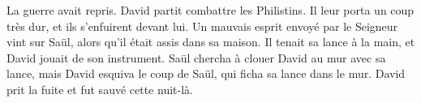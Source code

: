 La guerre avait repris.
	David partit combattre les Philistins.
Il leur porta un coup très dur, et ils s’enfuirent devant lui.
Un mauvais esprit envoyé par le Seigneur vint sur Saül,
	alors qu’il était assis dans sa maison.
Il tenait sa lance à la main, et David jouait de son instrument.
Saül chercha à clouer David au mur avec sa lance,
	mais David esquiva le coup de Saül, qui ficha sa lance dans le mur.
David prit la fuite et fut sauvé cette nuit-là.
